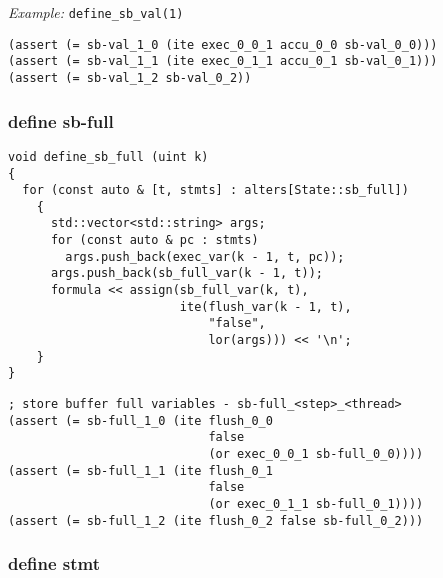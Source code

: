 \noindent
\emph{Example:} \lstinline[style=c++]{define_sb_val(1)}

\begin{lstlisting}[language=SMTLib]
(assert (= sb-val_1_0 (ite exec_0_0_1 accu_0_0 sb-val_0_0)))
(assert (= sb-val_1_1 (ite exec_0_1_1 accu_0_1 sb-val_0_1)))
(assert (= sb-val_1_2 sb-val_0_2))
\end{lstlisting}

\subsubsection{define sb-full}

\begin{lstlisting}[style=c++]
void define_sb_full (uint k)
{
  for (const auto & [t, stmts] : alters[State::sb_full])
    {
      std::vector<std::string> args;
      for (const auto & pc : stmts)
        args.push_back(exec_var(k - 1, t, pc));
      args.push_back(sb_full_var(k - 1, t));
      formula << assign(sb_full_var(k, t),
                        ite(flush_var(k - 1, t),
                            "false",
                            lor(args))) << '\n';
    }
}
\end{lstlisting}

\begin{lstlisting}[language=SMTLib]
; store buffer full variables - sb-full_<step>_<thread>
(assert (= sb-full_1_0 (ite flush_0_0
                            false
                            (or exec_0_0_1 sb-full_0_0))))
(assert (= sb-full_1_1 (ite flush_0_1
                            false
                            (or exec_0_1_1 sb-full_0_1))))
(assert (= sb-full_1_2 (ite flush_0_2 false sb-full_0_2)))
\end{lstlisting}

\subsubsection{define stmt}


